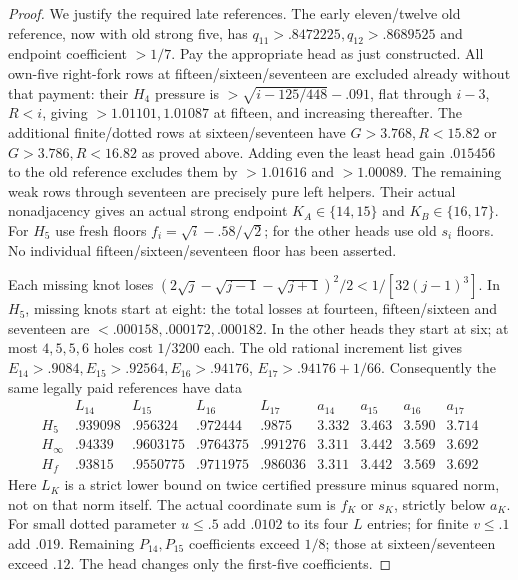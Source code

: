 \begin{proof}
We justify the required late references. The early eleven/twelve
old reference, now with old strong five, has
$q_{11}>.8472225,q_{12}>.8689525$ and endpoint coefficient
$>1/7$. Pay the appropriate head as just constructed.
All own-five right-fork rows at fifteen/sixteen/seventeen are
excluded already without that payment: their $H_4$ pressure
is $>\sqrt{i-125/448}-.091$, flat through $i-3$, $R<i$,
giving $>1.01101,1.01087$ at fifteen, and increasing thereafter.
The additional finite/dotted rows at sixteen/seventeen have
$G>3.768,R<15.82$ or $G>3.786,R<16.82$ as proved above.
Adding even the least head gain $.015456$ to the old reference
excludes them by $>1.01616$ and $>1.00089$.
The remaining weak rows through seventeen are precisely pure
left helpers. Their actual nonadjacency gives an actual strong
endpoint $K_A\in\{14,15\}$ and $K_B\in\{16,17\}$.
For $H_5$ use fresh floors $f_i=\sqrt i-.58/\sqrt2$;
for the other heads use old $s_i$ floors. No individual
fifteen/sixteen/seventeen floor has been asserted.

Each missing knot loses
$(2\sqrt j-\sqrt{j-1}-\sqrt{j+1})^2/2
<1/[32(j-1)^3]$. In $H_5$, missing knots start at eight:
the total losses at fourteen, fifteen/sixteen and seventeen
are $<.000158,.000172,.000182$.
In the other heads they start at six; at most $4,5,5,6$
holes cost $1/3200$ each. The old rational increment list gives
$E_{14}>.9084,E_{15}>.92564,E_{16}>.94176$,
$E_{17}>.94176+1/66$.
Consequently the same legally paid references have data
\[
\begin{array}{c|rrrr|rrrr}
 &L_{14}&L_{15}&L_{16}&L_{17}
 &a_{14}&a_{15}&a_{16}&a_{17}\\\hline
H_5&.939098&.956324&.972444&.9875&3.332&3.463&3.590&3.714\\
H_\infty&.94339&.9603175&.9764375&.991276&3.311&3.442&3.569&3.692\\
H_f&.93815&.9550775&.9711975&.986036&3.311&3.442&3.569&3.692
\end{array}
\]
Here $L_K$ is a strict lower bound on twice certified pressure
minus squared norm, not on that norm itself. The actual coordinate
sum is $f_K$ or $s_K$, strictly below $a_K$.
For small dotted parameter $u\le.5$ add $.0102$ to its four
$L$ entries; for finite $v\le.1$ add $.019$.
Remaining $P_{14},P_{15}$ coefficients exceed $1/8$;
those at sixteen/seventeen exceed $.12$. The head changes
only the first-five coefficients.


\end{proof}
